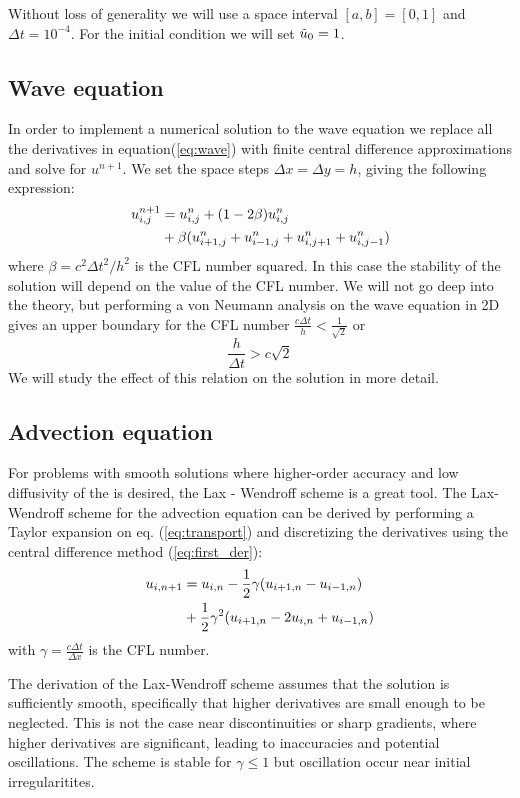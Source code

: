 \documentclass[5p,sort&compress]{elsarticle}
\numberwithin{equation}{subsection}
\begin{document}
Without loss of generality we will use a space interval $[a,b] = [0,1]$ and $\Delta t = 10^{-4}$. For the initial condition we will set $\Tilde{u}_0 = 1$. 

\subsection{Wave equation}
In order to implement a numerical solution to the wave equation we replace all the derivatives in equation(\ref{eq:wave}) with finite central difference approximations and solve for $u^{n+1}$. We set the space steps $\Delta x = \Delta y = h$, giving the following expression:
\begin{align}
         u^{n+1}_{i,j} &= u^n_{i,j} + (1 - 2\beta)u^n_{i,j} \notag
         \\ &+\beta(u^n_{i+1,j} + u^n_{i-1,j} + u^n_{i,j+1} + u^n_{i,j-1})    \label{wave_discrete}
\end{align}
where $\beta = c^2 \Delta t^2/h^2$ is the CFL number squared.
In this case the stability of the solution will depend on the value of the CFL number. We will not go deep into the theory, but performing a von Neumann analysis on the wave equation in 2D gives an upper boundary for the CFL number $\frac{c\Delta t}{h}<\frac{1}{\sqrt{2}}$ \cite{von_neumann_ansys} or 
\begin{equation}
    \frac{h}{\Delta t} > c \sqrt{2}
\end{equation}
We will study the effect of this relation on the solution in more detail. 
\subsection{Advection equation}

For problems with smooth solutions where higher-order accuracy and low diffusivity of the is desired, the Lax - Wendroff scheme is a great tool. The Lax-Wendroff scheme for the advection equation can be derived by performing a Taylor expansion on eq. (\ref{eq:transport}) and discretizing the derivatives using the central difference method (\ref{eq:first_der}):
\begin{align}
        u_{i,n+1} &= u_{i,n} - \frac{1}{2}\gamma (u_{i+1,n} - u_{i-1,n})  \notag\\ &+ \frac{1}{2}\gamma^2 (u_{i+1,n} - 2 u_{i,n} + u_{i-1,n})
\end{align}
with $\gamma = \frac{c \Delta t}{\Delta x}$ is the CFL number. \cite{assignment}

The derivation of the Lax-Wendroff scheme assumes that the solution is sufficiently smooth, specifically that higher derivatives are small enough to be neglected. This is not the case near discontinuities or sharp gradients, where higher derivatives are significant, leading to inaccuracies and potential oscillations. The scheme is stable for $\gamma \leq 1$ but oscillation occur near initial irregularitites. 
\end{document}
